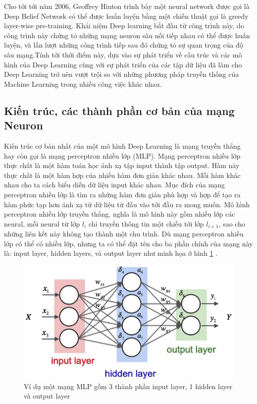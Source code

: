 Cho tới tới năm 2006, Geoffrey Hinton trình bày một neural network được gọi là Deep Belief Network có thể được huấn luyện bằng một chiến thuật gọi là greedy layer-wise pre-training. Khái niệm Deep learning bắt đầu từ công trình này, do công trình này chứng tỏ những mạng neuron sâu nối tiếp nhau có thể được huấn luyện, và lần lượt những công trình tiếp sau đó chứng tỏ sự quan trọng của độ sâu mạng.Tính tới thời điểm này, dựa vào sự phát triển về cấu trúc và các mô hình của Deep Learning cùng với sự phát triển của các tập dữ liệu đã làm cho Deep Learning trở nên vượt trội so với những phương pháp truyền thống của Machine Learning trong nhiều công việc khác nhau.

\subsection{Kiến trúc, các thành phần cơ bản của mạng Neuron }
Kiến trúc cơ bản nhất của một mô hình Deep Learning là mạng truyền thẳng hay còn gọi là mạng perceptron nhiều lớp (MLP). Mạng perceptron nhiều lớp thực chất là một hàm toán học ánh xạ tập input thành tập output. Hàm này thực chất là một hàm hợp của nhiều hàm đơn giản khác nhau. Mỗi hàm khác nhau cho ta cách biểu diễn dữ liệu input khác nhau. Mục đích của mạng perceptron nhiều lớp là tìm ra những hàm đơn giản phù hợp và hợp để tạo ra hàm phức tạp hơn ánh xạ từ dữ liệu từ đầu vào tới đầu ra mong muốn. Mô hình perceptron nhiều lớp truyền thẳng, nghĩa là mô hình này gồm nhiều lớp các neural, mỗi neural từ lớp $l_{i}$ chỉ truyền thông tin một chiều tới lớp $l_{i+1}$, sao cho những liên kết này không tạo thành một chu trình. Dù mạng perceptron nhiều lớp có thể có nhiều lớp, nhưng ta có thể đặt tên cho ba phần chính của mạng này là: input layer, hidden layers, và output layer như minh họa ở hình \ref{fig:mlp} .

\begin{figure}[tb]
\centering
\includegraphics[]{resources/chapter2_mlp.png}
\caption{Ví dụ một mạng MLP gồm 3 thành phần input layer, 1 hidden layer và output layer}
\label{fig:mlp}
\end{figure}

